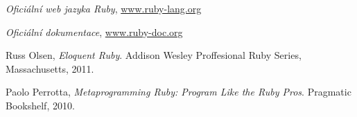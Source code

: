 \documentclass[12pt,a4paper,oneside]{article}
\begin{document}
\begin{thebibliography}{20}

  \emph{Oficiální web jazyka Ruby},
  \href{www.ruby-lang.org}{www.ruby-lang.org}

  \emph{Oficiální dokumentace},
  \href{www.ruby-doc.org}{www.ruby-doc.org}

  Russ Olsen,
  \emph{Eloquent Ruby}.
  Addison Wesley Proffesional Ruby Series, Massachusetts,
  2011.

  Paolo Perrotta,
  \emph{Metaprogramming Ruby: Program Like the Ruby Pros}.
  Pragmatic Bookshelf,
  2010.



\end{thebibliography}
\end{document}
